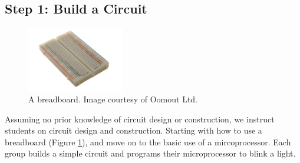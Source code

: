 \documentclass[11pt]{article}
\begin{document}
\subsection*{Step 1: Build a Circuit}
\begin{figure}
    \includegraphics[width=0.38\textwidth]{figures/400_points_breadboard.jpg}
    \caption{\label{breadboard}
        A breadboard. Image courtesy of Oomout Ltd.
    }
\end{figure}
Assuming no prior knowledge of circuit design or construction, we instruct students on circuit design and construction.  Starting with how to use a breadboard (Figure \ref{breadboard}), and move on to the basic use of a mircoprocessor.  Each group builds a simple circuit and programs their microprocessor to blink a light.








%

\end{document}
